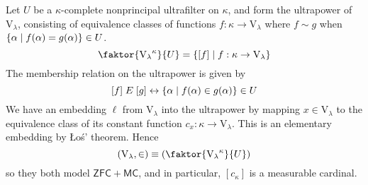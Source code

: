 Let \( U \) be a \( \kappa \)-complete nonprincipal ultrafilter on \( \kappa \), and form the ultrapower of \( \mathrm{V}_\lambda \), consisting of equivalence classes of functions \( f : \kappa \to \mathrm{V}_\lambda \) where \( f \sim g \) when \( \qty{\alpha \mid f(\alpha) = g(\alpha)} \in U \).
\[ \faktor{{\mathrm{V}_\lambda}^\kappa}{U} = \qty{[f] \mid f : \kappa \to \mathrm{V}_\lambda} \]
The membership relation on the ultrapower is given by
\[ [f] \mathrel{E} [g] \leftrightarrow \qty{\alpha \mid f(\alpha) \in g(\alpha)} \in U \]
We have an embedding \( \ell \) from \( \mathrm{V}_\lambda \) into the ultrapower by mapping \( x \in \mathrm{V}_\lambda \) to the equivalence class of its constant function \( c_x : \kappa \to \mathrm{V}_\lambda \).
This is an elementary embedding by \L{}o\'s' theorem.
Hence
\[ \qty(\mathrm{V}_\lambda, \in) \equiv \qty(\faktor{{\mathrm{V}_\lambda}^\kappa}{U}) \]
so they both model \( \mathsf{ZFC} + \mathsf{MC} \), and in particular, \( [c_{\kappa}] \) is a measurable cardinal.
